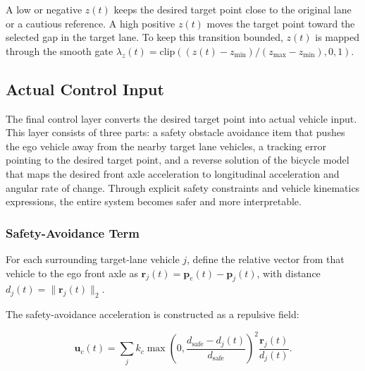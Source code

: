 A low or negative \(z(t)\) keeps the desired target point close to the original lane or a cautious reference. A high positive \(z(t)\) moves the target point toward the selected gap in the target lane. To keep this transition bounded, \(z(t)\) is mapped through the smooth gate \(\lambda_z(t)=\mathrm{clip}((z(t)-z_{\min})/(z_{\max}-z_{\min}),0,1)\).



\subsection{Actual Control Input}





The final control layer converts the desired target point into actual vehicle input. This layer consists of three parts: a safety obstacle avoidance item that pushes the ego vehicle away from the nearby target lane vehicles, a tracking error pointing to the desired target point, and a reverse solution of the bicycle model that maps the desired front axle acceleration to longitudinal acceleration and angular rate of change. Through explicit safety constraints and vehicle kinematics expressions, the entire system becomes safer and more interpretable.



\subsubsection{Safety-Avoidance Term}





For each surrounding target-lane vehicle \(j\), define the relative vector from that vehicle to the ego front axle as \(\mathbf{r}_j(t)=\mathbf{p}_e(t)-\mathbf{p}_j(t)\), with distance \(d_j(t)=\lVert \mathbf{r}_j(t)\rVert_2\).





The safety-avoidance acceleration is constructed as a repulsive field:



{\small
\begin{equation}
\mathbf{u}_c(t) =
\sum_j
k_c
\max\left(0,\frac{d_{\mathrm{safe}}-d_j(t)}{d_{\mathrm{safe}}}\right)^2
\frac{\mathbf{r}_j(t)}{d_j(t)}.
\end{equation}
}





